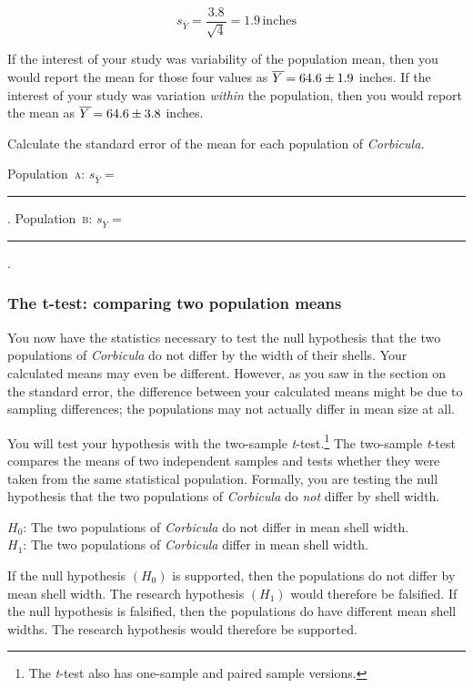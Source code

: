 \documentclass[12pt]{exam}
\newcommand*\meanY{\overline{Y\kern1.67pt}\kern-1.67pt}
\newcommand*\meansubY{\overline{Y}}
\newcommand*\ttest{\emph{t}-test}
\newcommand*\Popa{Population~\textsc{a}}
\newcommand*\Popb{Population~\textsc{b}}
\newcommand*\Corbicula{\textit{Corbicula}}
\newcommand*\AnswerBlank{\rule{0.75in}{0.4pt}\kern0.67pt.}
\begin{document}
\begin{questions}
\[	s_{\meansubY} = \frac{3.8}{\sqrt{4}} = 1.9\,\mathrm{inches} \]

If the interest of your study was variability of the population mean, then you would report the mean for those four values as $\meanY = 64.6 \pm 1.9$ inches. If the interest of your study was variation \emph{within} the population, then you would report the mean as $\meanY = 64.6 \pm 3.8$ inches. 

\question
Calculate the standard error of the mean for each population of \textit{Corbicula.}

\bigskip

\Popa{}: $s_{\meansubY} =$  \AnswerBlank{} \qquad 
\Popb{}: $s_{\meansubY} =$  \AnswerBlank{}


\subsubsection*{The t-test: comparing two population means}

You now have the statistics necessary to test the null hypothesis that the two populations of \Corbicula{} do not differ by the width of their shells. Your calculated means may even be different. However, as you saw in the section on the standard error, the difference between your calculated means might be due to sampling differences; the populations may not actually differ in mean size at all.

You will test your hypothesis with the two-sample \ttest{}.\footnote{The \ttest{} also has one-sample and paired sample versions.} The two-sample \ttest{} compares the means of two independent samples and tests whether they were taken from the same statistical population. Formally, you are testing the null hypothesis that the two populations of \Corbicula{} do \emph{not} differ by shell width. 

\hspace*{1em} $H_0$: The two populations of \Corbicula{} do not differ in mean shell width.\label{two_hypotheses}\\
\hspace*{1em} $H_1$: The two populations of \Corbicula{} differ in mean shell width.

If the null hypothesis $\left(H_0\right)$ is supported, then the populations do not differ by mean shell width. The research hypothesis $\left(H_1\right)$ would therefore be falsified. If the null hypothesis is falsified, then the populations do have different mean shell widths. The research hypothesis would therefore be supported.


\end{questions}
\end{document}
